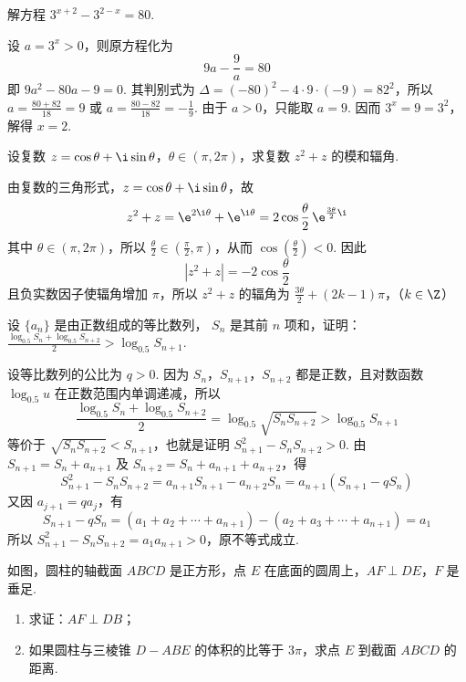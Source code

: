 \begin{problem}
解方程 \(3^{x + 2} - 3^{2 - x} = 80\).
\end{problem}

\begin{solution}
设 \(a=3^x>0\)，则原方程化为
\[
9a-\frac{9}{a}=80
\]
即 \(9a^2-80a-9=0\). 其判别式为 \(\Delta=(-80)^2-4\cdot9\cdot(-9)=82^2\)，所以 \(a=\frac{80+82}{18}=9\) 或 \(a=\frac{80-82}{18}=-\frac{1}{9}\).
由于 \(a>0\)，只能取 \(a=9\). 因而 \(3^x=9=3^2\)，解得 \(x=2\).
\end{solution}

\begin{problem}
设复数 \(z = \cos \theta + \i\sin \theta\)，\(\theta \in (\pi, 2\pi)\)，求复数 \(z^2 + z\) 的模和辐角.
\end{problem}

\begin{solution}
由复数的三角形式，\(z=\cos\theta+\i\sin\theta\)，故
\[
z^2+z=\e^{2\i\theta}+\e^{\i\theta}=2\cos\frac{\theta}{2}\,\e^{\frac{3\theta}{2}\i}
\]
其中 \(\theta\in(\pi,2\pi)\)，所以 \(\frac{\theta}{2}\in(\frac{\pi}{2},\pi)\)，从而 \(\cos(\frac{\theta}{2})<0\). 因此
\[
\left|z^2+z\right|=-2\cos\frac{\theta}{2}
\]
且负实数因子使辐角增加 \(\pi\)，所以 \(z^2+z\) 的辐角为
\(\frac{3\theta}{2}+(2k-1)\pi\)，（\(k\in\Z\)）
\end{solution}

\begin{problem}
设 \(\{a_{n}\} \) 是由正数组成的等比数列， \(S_{n} \) 是其前 \(n\) 项和，证明： \(\frac{\log_{0.5}S_{n}+\log_{0.5}S_{n+2}}{2}>\log_{0.5}S_{n+1}\).
\end{problem}

\begin{solution}
设等比数列的公比为 \(q>0\). 因为 \(S_n\)，\(S_{n+1}\)，\(S_{n+2}\) 都是正数，且对数函数 \(\log_{0.5}u\) 在正数范围内单调递减，所以
\[
\frac{\log_{0.5}S_n+\log_{0.5}S_{n+2}}{2}
=\log_{0.5}\sqrt{S_nS_{n+2}}>\log_{0.5}S_{n+1}
\]
等价于 \(\sqrt{S_nS_{n+2}}<S_{n+1}\)，也就是证明 \(S_{n+1}^2-S_nS_{n+2}>0\). 由 \(S_{n+1}=S_n+a_{n+1}\) 及 \(S_{n+2}=S_n+a_{n+1}+a_{n+2}\)，得
\[
S_{n+1}^2-S_nS_{n+2}=a_{n+1}S_{n+1}-a_{n+2}S_n=a_{n+1}\left(S_{n+1}-qS_n\right)
\]
又因 \(a_{j+1}=qa_j\)，有
\[
S_{n+1}-qS_n=(a_1+a_2+\cdots+a_{n+1})-(a_2+a_3+\cdots+a_{n+1})=a_1
\]
所以 \(S_{n+1}^2-S_nS_{n+2}=a_1a_{n+1}>0\)，原不等式成立.
\end{solution}

\begin{problem}
如图，圆柱的轴截面 \(ABCD\) 是正方形，点 \(E\) 在底面的圆周上，\(AF \perp DE\)，\(F\) 是垂足.

\begin{enumerate}
\item 求证：\(AF \perp DB\)；
\item 如果圆柱与三棱锥 \(D-ABE\) 的体积的比等于 \(3\pi \)，求点 \(E\) 到截面 \(ABCD\) 的距离.
\end{enumerate}

\end{problem}

